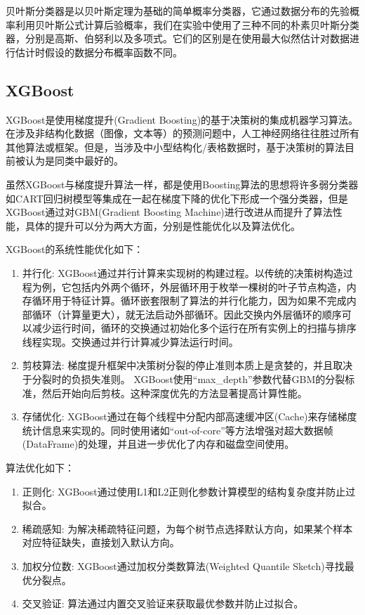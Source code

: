 贝叶斯分类器是以贝叶斯定理为基础的简单概率分类器，它通过数据分布的先验概率利用贝叶斯公式计算后验概率，我们在实验中使用了三种不同的朴素贝叶斯分类器，分别是高斯、伯努利以及多项式。它们的区别是在使用最大似然估计对数据进行估计时假设的数据分布概率函数不同。

\subsection{XGBoost}

XGBoost\cite{chen2015xgboost}是使用梯度提升(Gradient Boosting)的基于决策树的集成机器学习算法。在涉及非结构化数据（图像，文本等）的预测问题中，人工神经网络往往胜过所有其他算法或框架。但是，当涉及中小型结构化/表格数据时，基于决策树的算法目前被认为是同类中最好的。

虽然XGBoost与梯度提升算法一样，都是使用Boosting算法的思想将许多弱分类器如CART回归树模型等集成在一起在梯度下降的优化下形成一个强分类器，但是XGBoost通过对GBM(Gradient Boosting Machine)进行改进从而提升了算法性能，具体的提升可以分为两大方面，分别是性能优化以及算法优化。

XGBoost的系统性能优化如下：

\begin{enumerate}
  \item 并行化: XGBoost通过并行计算来实现树的构建过程。以传统的决策树构造过程为例，它包括内外两个循环，外层循环用于枚举一棵树的叶子节点构造，内存循环用于特征计算。循环嵌套限制了算法的并行化能力，因为如果不完成内部循环（计算量更大），就无法启动外部循环。因此交换内外层循环的顺序可以减少运行时间，循环的交换通过初始化多个运行在所有实例上的扫描与排序线程实现。交换通过并行计算减少算法运行时间。
  \item 剪枝算法: 梯度提升框架中决策树分裂的停止准则本质上是贪婪的，并且取决于分裂时的负损失准则。 XGBoost使用“max\_depth”参数代替GBM的分裂标准，然后开始向后剪枝。这种深度优先的方法显著提高计算性能。
  \item 存储优化: XGBoost通过在每个线程中分配内部高速缓冲区(Cache)来存储梯度统计信息来实现的。同时使用诸如“out-of-core”等方法增强对超大数据帧(DataFrame)的处理，并且进一步优化了内存和磁盘空间使用。
\end{enumerate}

算法优化如下：

\begin{enumerate}
  \item 正则化: XGBoost通过使用L1和L2正则化参数计算模型的结构复杂度并防止过拟合。
  \item 稀疏感知: 为解决稀疏特征问题，为每个树节点选择默认方向，如果某个样本对应特征缺失，直接划入默认方向。\cite{XGBoost原理解析}
  \item 加权分位数: XGBoost通过加权分类数算法(Weighted Quantile Sketch)寻找最优分裂点。
  \item 交叉验证: 算法通过内置交叉验证来获取最优参数并防止过拟合。
\end{enumerate}

